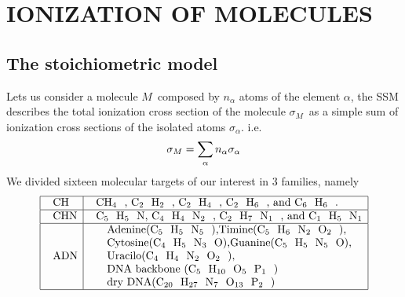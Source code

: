 \documentclass[preprint,showpacs,pra]{revtex4}
\begin{document}
\section{IONIZATION OF MOLECULES}

\subsection{The stoichiometric model}

Lets us consider a molecule $M$\ composed by $n_{\alpha }$ atoms of the
element $\alpha $, the SSM describes the total ionization cross section of
the molecule $\sigma _{M}$\ as a simple sum of ionization cross sections of
the isolated atoms $\sigma _{\alpha }.$ i.e. 
\begin{equation}
\sigma _{M}=\dsum\limits_{\alpha }n_{\alpha }\sigma _{\alpha }  \label{10}
\end{equation}%
We divided sixteen molecular targets of our interest in 3 families, namely%
\begin{equation}
\begin{array}{|l|l|}
\hline
\text{CH} & \text{CH}_{4}\text{,\ C}_{2}\text{H}_{2}\text{, C}_{2}\text{H}%
_{4}\text{, C}_{2}\text{H}_{6}\text{, and C}_{6}\text{H}_{6}\text{.} \\ 
\hline
\text{CHN} & \text{C}_{5}\text{H}_{5}\text{N, C}_{4}\text{H}_{4}\text{N}_{2}%
\text{,\ C}_{2}\text{H}_{7}\text{N}_{1}\text{, and\ C}_{1}\text{H}_{5}\text{N%
}_{1} \\ \hline
\text{ADN} & 
\begin{array}{l}
\begin{array}{l}
\text{Adenine(C}_{5}\text{H}_{5}\text{N}_{5}\text{),Timine(C}_{5}\text{H}_{6}%
\text{N}_{2}\text{O}_{2}\text{),} \\ 
\text{Cytosine(C}_{4}\text{H}_{5}\text{N}_{3}\text{O),Guanine(C}_{5}\text{H}%
_{5}\text{N}_{5}\text{O),} \\ 
\text{Uracilo(C}_{4}\text{H}_{4}\text{N}_{2}\text{O}_{2}\text{)},%
\end{array}
\\ 
\begin{array}{l}
\text{DNA backbone (C}_{5}\text{H}_{10}\text{O}_{5}\text{P}_{1}\text{)} \\ 
\text{dry DNA(C}_{20}\text{H}_{27}\text{N}_{7}\text{O}_{13}\text{P}_{2}\text{%
)}%
\end{array}%
\end{array}
\\ \hline
\end{array}
\label{20}
\end{equation}
\end{document}
